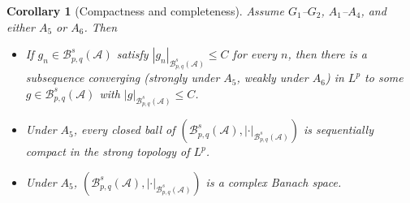 \documentclass[11pt]{amsart}
\newtheorem{corollary}[theorem]{Corollary}
\theoremstyle{definition}
\begin{document}
\begin{corollary}[Compactness and completeness]\label{compa1}
Assume $G_1$--$G_2$, $A_1$--$A_4$, and either $A_5$ or $A_6$. Then
\begin{itemize}
\item[i.] If $g_n \in \mathcal{B}^s_{p,q}(\mathcal{A})$ satisfy
$|g_n|_{\mathcal{B}^s_{p,q}(\mathcal{A})}\leq C$ for every $n$, then there is
a subsequence converging (strongly under $A_5$, weakly under $A_6$) in $L^p$
to some $g \in \mathcal{B}^s_{p,q}(\mathcal{A})$ with
$|g|_{\mathcal{B}^s_{p,q}(\mathcal{A})}\leq C$.
\item[ii.] Under $A_5$, every closed ball of
$(\mathcal{B}^s_{p,q}(\mathcal{A}),|\cdot|_{\mathcal{B}^s_{p,q}(\mathcal{A})})$
is sequentially compact in the strong topology of
$L^p$.
\item[iii.] Under $A_5$,
$(\mathcal{B}^s_{p,q}(\mathcal{A}),|\cdot|_{\mathcal{B}^s_{p,q}(\mathcal{A})})$
is a complex Banach space.
\end{itemize}
\end{corollary}
\end{document}
